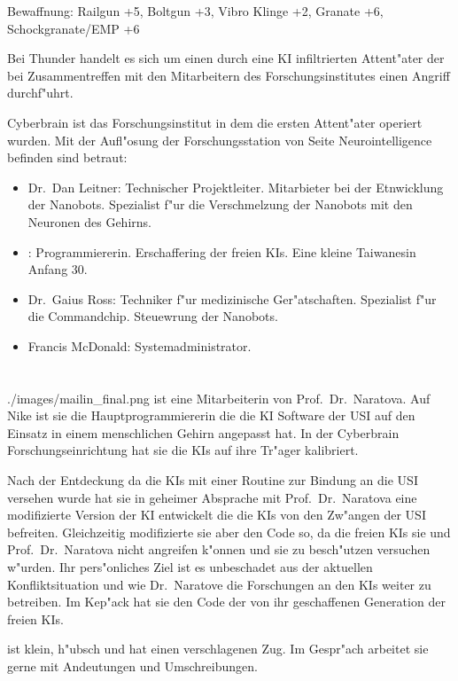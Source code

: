 Bewaffnung: Railgun +5, Boltgun +3, Vibro Klinge +2, Granate +6, Schockgranate/EMP +6 

Bei Thunder handelt es sich um einen durch eine KI infiltrierten Attent"ater der bei Zusammentreffen mit den 
Mitarbeitern des Forschungsinstitutes einen Angriff durchf"uhrt.

\renewcommand{\ml}{\pinyin{Mailin2}}


Cyberbrain ist das Forschungsinstitut in dem die ersten Attent"ater operiert wurden. Mit der Aufl"osung der Forschungsstation von Seite Neurointelligence befinden sind betraut:

\begin{itemize}
    \item Dr.~Dan Leitner: Technischer Projektleiter. Mitarbieter bei der Etnwicklung der Nanobots. Spezialist f"ur die Verschmelzung 
        der  Nanobots mit den Neuronen des Gehirns.
    \item \ml{}: Programmiererin. Erschaffering der freien KIs. Eine kleine Taiwanesin Anfang 30. 
    \item Dr.~Gaius Ross: Techniker f"ur medizinische Ger"atschaften. Spezialist f"ur die Commandchip. Steuewrung der Nanobots.
    \item Francis McDonald: Systemadministrator.
\end{itemize}

\newpage
\section[Mailin]{\ml{}}



\begin{sideimagebox}[r]{0.6}{./images/mailin_final.png}{\ml}
    \ml{} ist eine Mitarbeiterin von Prof.~Dr.~Naratova. Auf Nike ist sie die Hauptprogrammiererin die die KI Software der USI auf den Einsatz in einem menschlichen Gehirn angepasst hat.  In der Cyberbrain Forschungseinrichtung hat sie die KIs auf ihre Tr"ager kalibriert.

    Nach der Entdeckung da\3 die KIs mit einer Routine zur Bindung an die USI versehen wurde hat sie in geheimer Absprache mit Prof.~Dr.~Naratova eine modifizierte Version der KI entwickelt die die KIs von den Zw"angen der USI befreiten. Gleichzeitig modifizierte sie aber den Code so, da\3 die freien KIs sie und Prof.~Dr.~Naratova nicht angreifen k"onnen und sie zu besch"utzen versuchen w"urden. Ihr pers"onliches Ziel ist es unbeschadet aus der aktuellen Konfliktsituation und wie Dr.~Naratove die Forschungen an den KIs weiter zu betreiben. Im Kep"ack hat sie den Code der von ihr geschaffenen Generation der freien KIs.

    \ml{} ist klein, h"ubsch und hat einen verschlagenen Zug. Im Gespr"ach arbeitet sie gerne mit Andeutungen und Umschreibungen.
\end{sideimagebox}


